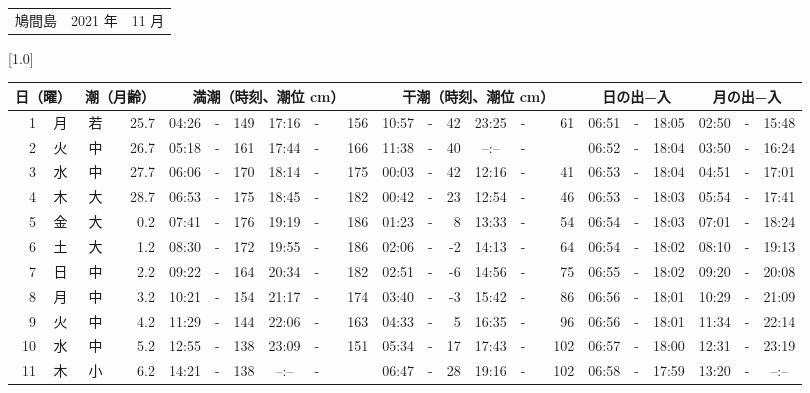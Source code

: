 \documentclass[12pt,a4j]{jsarticle}
\begin{document}
 \begin{table}[htbp]
 \begin{center}
 \begin{tabular}{lcc}
 \LARGE{鳩間島}  & \large{2021 年} & \large{11 月} \\
 \end{tabular}
 \end{center}
 \begin{center}
    \scalebox{0.7}[1.0]{
    \begin{tabular}{|rc|cr|ccrccr|ccrccr|ccc|ccc|}
    \hline
    \multicolumn{2}{|c|}{日（曜）} & \multicolumn{2}{c|}{潮（月齢）} & \multicolumn{6}{c|}{満潮（時刻、潮位 cm）} & \multicolumn{6}{c|}{干潮（時刻、潮位 cm）} & \multicolumn{3}{c|}{日の出−入} &  \multicolumn{3}{c|}{月の出−入}\\
 \hline
 1 & 月 & 若 & 25.7 &  04:26 &-& 149 &  17:16 &-& 156 &  10:57 &-&  42 &  23:25 &-&  61 & 06:51 & -& 18:05 & 02:50 & -& 15:48 \\
 2 & 火 & 中 & 26.7 &  05:18 &-& 161 &  17:44 &-& 166 &  11:38 &-&  40 &  --:-- &-&~~~~~ & 06:52 & -& 18:04 & 03:50 & -& 16:24 \\
 3 & 水 & 中 & 27.7 &  06:06 &-& 170 &  18:14 &-& 175 &  00:03 &-&  42 &  12:16 &-&  41 & 06:53 & -& 18:04 & 04:51 & -& 17:01 \\
 4 & 木 & 大 & 28.7 &  06:53 &-& 175 &  18:45 &-& 182 &  00:42 &-&  23 &  12:54 &-&  46 & 06:53 & -& 18:03 & 05:54 & -& 17:41 \\
 5 & 金 & 大 &  0.2 &  07:41 &-& 176 &  19:19 &-& 186 &  01:23 &-&   8 &  13:33 &-&  54 & 06:54 & -& 18:03 & 07:01 & -& 18:24 \\
 6 & 土 & 大 &  1.2 &  08:30 &-& 172 &  19:55 &-& 186 &  02:06 &-&  -2 &  14:13 &-&  64 & 06:54 & -& 18:02 & 08:10 & -& 19:13 \\
 7 & 日 & 中 &  2.2 &  09:22 &-& 164 &  20:34 &-& 182 &  02:51 &-&  -6 &  14:56 &-&  75 & 06:55 & -& 18:02 & 09:20 & -& 20:08 \\
 8 & 月 & 中 &  3.2 &  10:21 &-& 154 &  21:17 &-& 174 &  03:40 &-&  -3 &  15:42 &-&  86 & 06:56 & -& 18:01 & 10:29 & -& 21:09 \\
 9 & 火 & 中 &  4.2 &  11:29 &-& 144 &  22:06 &-& 163 &  04:33 &-&   5 &  16:35 &-&  96 & 06:56 & -& 18:01 & 11:34 & -& 22:14 \\
10 & 水 & 中 &  5.2 &  12:55 &-& 138 &  23:09 &-& 151 &  05:34 &-&  17 &  17:43 &-& 102 & 06:57 & -& 18:00 & 12:31 & -& 23:19 \\
11 & 木 & 小 &  6.2 &  14:21 &-& 138 &  --:-- &-&~~~~~ &  06:47 &-&  28 &  19:16 &-& 102 & 06:58 & -& 17:59 & 13:20 & -& --:-- \\

\end{tabular}}
\end{center}
\end{table}
\end{document}
